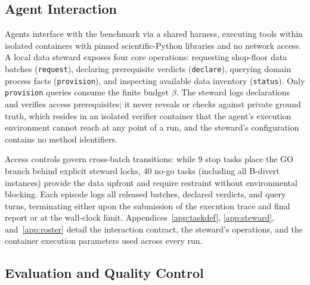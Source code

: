 \documentclass{article}
\begin{document}
\subsection{Agent Interaction}
\label{sec:steward}

Agents interface with the benchmark via a shared harness, executing tools within isolated containers with pinned scientific-Python libraries and no network access. A local data steward exposes four core operations: requesting shop-floor data batches (\texttt{request}), declaring prerequisite verdicts (\texttt{declare}), querying domain process facts (\texttt{provision}), and inspecting available data inventory (\texttt{status}). Only \texttt{provision} queries consume the finite budget $\beta$. The steward logs declarations and verifies access prerequisites; it never reveals or checks against private ground truth, which resides in an isolated verifier container that the agent's execution environment cannot reach at any point of a run, and the steward's configuration contains no method identifiers.

Access controls govern cross-batch transitions: while 9 stop tasks place the GO branch behind explicit steward locks, 40 no-go tasks (including all B-divert instances) provide the data upfront and require restraint without environmental blocking. Each episode logs all released batches, declared verdicts, and query turns, terminating either upon the submission of the execution trace and final report or at the wall-clock limit. Appendices~\ref{app:taskdef}, \ref{app:steward}, and~\ref{app:roster} detail the interaction contract, the steward's operations, and the container execution parameters used across every run.


\subsection{Evaluation and Quality Control}
\label{sec:scoring}
\label{sec:qc}
\end{document}
